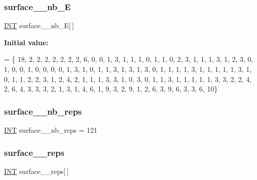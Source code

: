 \mbox{\label{surface__49_8_c_a16779407e90d9c1096d59f7bf7d4af6b}} 
\subsubsection{\texorpdfstring{surface\+\_\+\_\+nb\+\_\+E}{surface\_49\_nb\_E}}
{\footnotesize\ttfamily \mbox{\hyperlink{galois_8h_a09fddde158a3a20bd2dcadb609de11dc}{I\+NT}} surface\+\_\+\_\+nb\+\_\+E\mbox{[}$\,$\mbox{]}}

{\bfseries Initial value\+:}
\begin{DoxyCode}
= \{ 
    18, 2, 2, 2, 2, 2, 2, 2, 6, 0, 
    0, 1, 3, 1, 1, 1, 0, 1, 1, 0, 
    2, 3, 1, 1, 1, 3, 1, 2, 3, 0, 
    1, 0, 0, 1, 0, 0, 0, 0, 1, 3, 
    1, 0, 1, 1, 3, 1, 3, 1, 3, 0, 
    1, 1, 1, 1, 3, 1, 1, 1, 1, 1, 
    3, 1, 0, 1, 1, 2, 2, 3, 1, 2, 
    4, 2, 1, 1, 1, 3, 3, 1, 0, 3, 
    0, 1, 1, 3, 1, 1, 1, 1, 1, 3, 
    3, 2, 2, 4, 2, 6, 4, 3, 3, 3, 
    2, 1, 3, 1, 4, 6, 1, 9, 3, 2, 
    9, 1, 2, 6, 3, 9, 6, 3, 3, 6, 
    10\}
\end{DoxyCode}
\mbox{\label{surface__49_8_c_a48efff6d7735f17bca8779c31190d909}} 
\subsubsection{\texorpdfstring{surface\+\_\+\_\+nb\+\_\+reps}{surface\_49\_nb\_reps}}
{\footnotesize\ttfamily \mbox{\hyperlink{galois_8h_a09fddde158a3a20bd2dcadb609de11dc}{I\+NT}} surface\+\_\+\_\+nb\+\_\+reps = 121}

\mbox{\label{surface__49_8_c_a21097ddef90edbc7b4f7b9d79a78b156}} 
\subsubsection{\texorpdfstring{surface\+\_\+\_\+reps}{surface\_49\_reps}}
{\footnotesize\ttfamily \mbox{\hyperlink{galois_8h_a09fddde158a3a20bd2dcadb609de11dc}{I\+NT}} surface\+\_\+\_\+reps\mbox{[}$\,$\mbox{]}}

